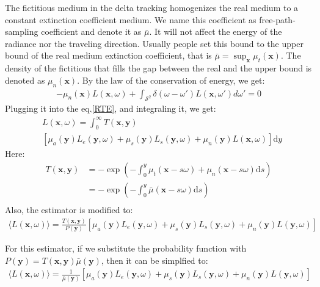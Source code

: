 \documentclass[acmtog]{acmart}
\begin{document}
The fictitious medium in the delta tracking homogenizes the real medium to a constant extinction coefficient medium. We name this coefficient as free-path-sampling coefficient and denote it as $\bar\mu$.
It will not affect the energy of the radiance nor the traveling direction.
Usually people set this bound to the upper bound of the real medium extinction coefficient, that is $\bar\mu=\sup_{\mathbf x}\mu_t(\mathbf x)$. 
The density of the fictitious that fills the gap between the real and the upper bound is denoted as $\mu_n(\mathbf x)$.
By the law of the conservation of energy, we get:
\begin{equation}
	\begin{aligned}
	-\mu_n(\mathbf x)L(\mathbf x, \omega)+\int_{\mathcal S^2}\delta(\omega-\omega')L(\mathbf x, \omega')d\omega'=0
	\end{aligned}
\end{equation}
Plugging it into the eq.\eqref{RTE}, and integraling it, we get:
\begin{equation}
	\begin{aligned}
	&L(\mathbf x, \omega)=\int_0^{\infty}T(\mathbf x, \mathbf y)\\
	&\left[\mu_a(\mathbf y)L_e(\mathbf y, \omega)+\mu_s(\mathbf y)L_s(\mathbf y, \omega)+\mu_n(\mathbf y)L(\mathbf x, \omega)\right]\mathrm dy\label{deltaRTE}
	\end{aligned}
\end{equation}
Here:
\begin{equation}
	\begin{aligned}
	T(\mathbf x, \mathbf y)&=-\exp\left(-\int_0^y\mu_t(\mathbf x-s\omega)+\mu_n(\mathbf x-s\omega)\mathrm ds\right)\\
	&=-\exp\left(-\int_0^y\bar\mu(\mathbf x-s\omega)\mathrm ds\right)\\
	\end{aligned}
\end{equation}
Also, the estimator is modified to:
\begin{equation}
	\begin{aligned}
	\langle L(\mathbf x, \omega)\rangle=\frac{T(\mathbf x, \mathbf y)}{P(\mathbf y)}\left[\mu_a(\mathbf y)L_e(\mathbf y, \omega)+\mu_s(\mathbf y)L_s(\mathbf y, \omega)+\mu_n(\mathbf y)L(\mathbf y, \omega)\right]
	\end{aligned}
\end{equation}

For this estimator, if we substitute the probability function with $P(\mathbf y)=T(\mathbf x, \mathbf y)\bar\mu(\mathbf y)$, then it can be simplfied to:
\begin{equation}
	\begin{aligned}
	\langle L(\mathbf x, \omega)\rangle=\frac{1}{\bar\mu(\mathbf y)}\left[\mu_a(\mathbf y)L_e(\mathbf y, \omega)+\mu_s(\mathbf y)L_s(\mathbf y, \omega)+\mu_n(\mathbf y)L(\mathbf y, \omega)\right]
	\end{aligned}
\end{equation}
\end{document}
